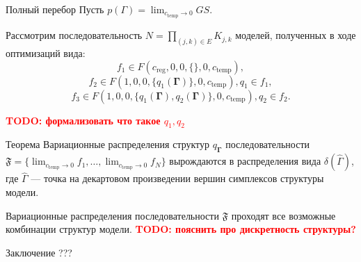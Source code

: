 \documentclass[usenames,dvipsnames,11pt,pdf,utf8,russian,aspectratio=169]{beamer}
\begin{document}
\begin{frame}{Полный перебор}
Пусть $p(\Gamma) = \lim_{c_\text{temp} \to 0} GS$.

Рассмотрим последовательность $N = \prod_{(j,k) \in E} K_{j,k}$ моделей, полученных в ходе оптимизаций вида:
$$f_1 \in F(c_{\text{reg}}, 0, 0, \{\}, 0,  c_{\text{temp}}),$$
$$f_2 \in F(1, 0, 0, \{q_1(\boldsymbol{\Gamma})\}, 0,  c_{\text{temp}}), q_1 \in f_1,$$
$$f_3 \in F(1, 0, 0, \{q_1(\boldsymbol{\Gamma}), q_2(\boldsymbol{\Gamma})\}, 0,  c_{\text{temp}}), q_2 \in f_2.$$

\textcolor{red}{\textbf{TODO: формализовать что такое $q_1, q_2$\\}}

\begin{block}{Теорема}
Вариационные распределения структур $q_{\boldsymbol{\Gamma}}$ последовательности $\mathfrak{F} = \{\lim_{c_{\text{temp}} \to 0} f_1, \dots, \lim_{c_{\text{temp}} \to 0} f_N\}$ вырождаются в распределения вида $\delta(\hat{\Gamma})$, где $\hat{\Gamma}$ --- точка на декартовом произведении вершин симплексов структуры модели.

Вариационные распределения последовательности $\mathfrak{F}$ проходят все возможные комбинации структур модели.
\textcolor{red}{\textbf{TODO: пояснить про дискретность структуры?\\}}
\end{block}
\end{frame}


\begin{frame}{Заключение}
???

\end{frame}

\appendix
\bgroup
{}
\begin{frame}
\end{frame}
\egroup
\end{document}
